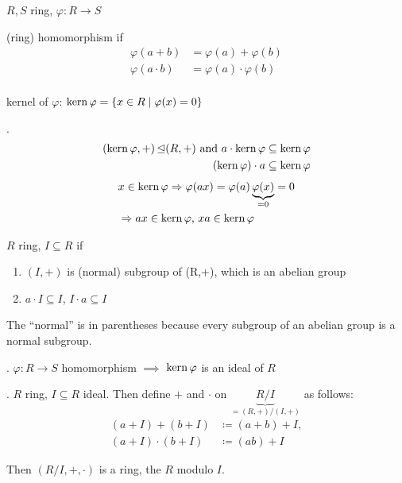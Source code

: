\begin{definition}
  $R,S$ ring, $\varphi : R \rightarrow S$

  (ring) homomorphism if
  \begin{align*}
    \varphi(a+b) &= \varphi(a) + \varphi(b)\\
    \varphi(a \cdot b) &= \varphi(a) \cdot \varphi(b)\\
  \end{align*}

  kernel of $\varphi$: $\operatorname{kern} \varphi = \{ x \in R \mid \varphi(x) = 0\}$
\end{definition}

\Theorem.
\begin{align*}
(\operatorname{kern} \varphi, +) \operatorname{\trianglelefteq} (R, +) \text{ and } a \cdot \operatorname{kern} \varphi &\subseteq \operatorname{kern} \varphi\\
(\operatorname{kern} \varphi) \cdot a &\subseteq \operatorname{kern} \varphi
\end{align*}
\begin{align*}
  &x \in \operatorname{kern} \varphi \Rightarrow \varphi(ax) = \varphi(a) \underbrace{\varphi(x)}_{=0} = 0 \\
  & \Rightarrow a x \in \operatorname{kern} \varphi \text{, } x a \in \operatorname{kern} \varphi
\end{align*}

\begin{definition}
  $R$ ring, $I \subseteq R$  if
  \begin{enumerate}
    \item $(I, +)$ is (normal) subgroup of (R,+), which is an abelian group
    \item $a \cdot I \subseteq I$, $I \cdot a \subseteq I$
  \end{enumerate}
\end{definition}

The ``normal'' is in parentheses because every subgroup of an abelian group is a normal subgroup.

\Remark.
$\varphi: R \rightarrow S$ homomorphism $\implies$ $\operatorname{kern} \varphi$ is an ideal of $R$

\Theorem.
$R$ ring, $ I \subseteq R$ ideal. Then define $+$ and $\cdot$ on $\underbrace{R / I}_{=(R,+)/(I,+)}$ as follows:
\begin{align*}
  (a+I) + (b+I) &\coloneqq (a+b)+I, \\
  (a+I) \cdot (b+I) &\coloneqq (ab) + I
\end{align*}

Then $(R / I, +, \cdot)$ is a ring, the  $R$ modulo $I$.

